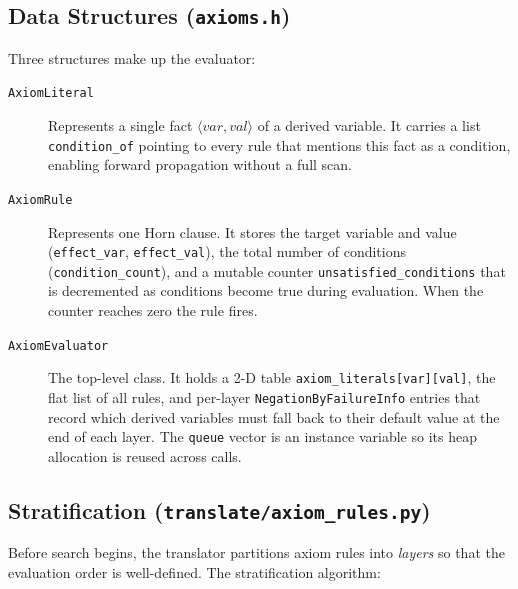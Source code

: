 \documentclass[11pt,a4paper]{article}
\begin{document}
\subsection{Data Structures (\texttt{axioms.h})}

Three structures make up the evaluator:

\begin{description}
  \item[\texttt{AxiomLiteral}] Represents a single fact $\langle\mathit{var},
        \mathit{val}\rangle$ of a derived variable.  It carries a list
        \texttt{condition\_of} pointing to every rule that mentions this fact as
        a condition, enabling forward propagation without a full scan.

  \item[\texttt{AxiomRule}] Represents one Horn clause.  It stores the target
        variable and value (\texttt{effect\_var}, \texttt{effect\_val}), the
        total number of conditions (\texttt{condition\_count}), and a mutable
        counter \texttt{unsatisfied\_conditions} that is decremented as
        conditions become true during evaluation.  When the counter reaches
        zero the rule fires.

  \item[\texttt{AxiomEvaluator}] The top-level class.  It holds a 2-D table
        \texttt{axiom\_literals[var][val]}, the flat list of all rules, and
        per-layer \texttt{NegationByFailureInfo} entries that record which
        derived variables must fall back to their default value at the end of
        each layer.  The \texttt{queue} vector is an instance variable so its
        heap allocation is reused across calls.
\end{description}

\subsection{Stratification (\texttt{translate/axiom\_rules.py})}

Before search begins, the translator partitions axiom rules into \emph{layers}
so that the evaluation order is well-defined.  The stratification algorithm:
\end{document}
